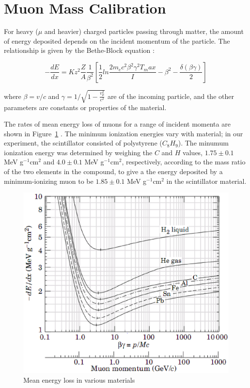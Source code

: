 
\section{Muon Mass Calibration}

For heavy ($\mu$ and heavier) charged particles passing through
matter, the amount of energy deposited depends on the incident
momentum of the particle. The relationship is given by the Bethe-Block
equation \cite{yao}:

\begin{equation}
-\frac{dE}{dx} = Kz^2\frac{Z}{A}\frac{1}{\beta^2}\left[\frac{1}{2}ln\frac{2m_ec^2\beta^2\gamma^2T_max}{I} - \beta^2 - \frac{\delta(\beta\gamma)}{2}\right]
\end{equation}

where $\beta = v/c$ and $\gamma = 1/\sqrt{1 - \frac{v_{\mu}^2}{c^2}}$
are of the incoming particle, and the other parameters are constants
or properties of the material.

The rates of mean energy loss of muons for a range of incident momenta
are shown in Figure~\ref{figure:dEdx} \cite{yao}. The minimum
ionization energies vary with material; in our experiment, the
scintillator consisted of polystyrene ($C_8H_9$). The minumum
ionization energy was determined by weighing the $C$ and $H$ values,
$1.75\pm 0.1$ MeV g$^{-1}$cm$^{2}$ and $4.0\pm 0.1$
MeV g$^{-1}$cm$^{2}$, respectively, according to the mass ratio of the
two elements in the compound, to give a the energy deposited by a
minimum-ionizing muon to be $1.85 \pm 0.1$ MeV g$^{-1}$cm$^{2}$ in the
scintillator material.

\label{energy_loss}
\begin{figure}[h]
\begin{center}
\includegraphics[width = 130mm]{figures/energy_loss.eps}
\caption{\small{Mean energy loss in various materials \cite{yao.}}}
\label{figure:dEdx}
\end{center}
\end{figure}


